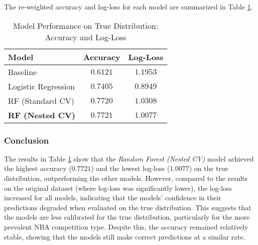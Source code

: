 \documentclass[fleqn,moreauthors,10pt]{ds_report}
\begin{document}
The re-weighted accuracy and log-loss for each model are summarized in Table \ref{tab:true_distribution_performance}.

\begin{table}[h]
\centering
\caption{Model Performance on True Distribution: Accuracy and Log-Loss}
\begin{tabular}{|l|c|c|}
\hline
\textbf{Model} & \textbf{Accuracy} & \textbf{Log-Loss} \\ \hline
Baseline & \( 0.6121 \) & \( 1.1953 \) \\ \hline
Logistic Regression & \( 0.7405 \) & \( 0.8949 \) \\ \hline
RF (Standard CV) & \( 0.7720 \) & \( 1.0308 \) \\ \hline
\textbf{RF (Nested CV)} & \( \mathbf{0.7721} \) & \( \mathbf{1.0077} \) \\ \hline
\end{tabular}
\label{tab:true_distribution_performance}
\end{table}

\subsubsection*{Conclusion}
The results in Table \ref{tab:true_distribution_performance} show that the \textit{Random Forest (Nested CV)} model achieved the highest accuracy (\( 0.7721 \)) and the lowest log-loss (\( 1.0077 \)) on the true distribution, outperforming the other models. However, compared to the results on the original dataset (where log-loss was significantly lower), the log-loss increased for all models, indicating that the models' confidence in their predictions degraded when evaluated on the true distribution. This suggests that the models are less calibrated for the true distribution, particularly for the more prevalent NBA competition type. Despite this, the accuracy remained relatively stable, showing that the models still make correct predictions at a similar rate.










\end{document}
